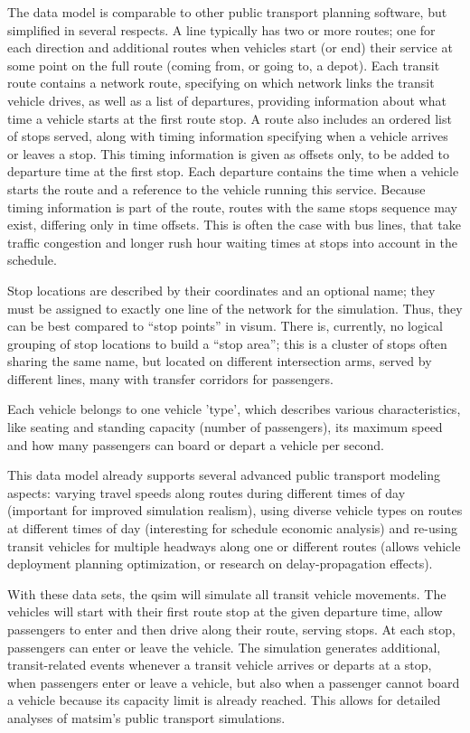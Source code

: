 The data model is comparable to other public transport planning
software, but simplified in several respects. A line typically has two or more
routes; one for each direction and additional routes when vehicles start
(or end) their service at some point on the full route (coming
from, or going to, a depot). Each transit route contains a network route,
specifying on which network links the transit vehicle drives, as well as
a list of departures, providing information about what time a vehicle
starts at the first route stop. A route also includes an ordered list
of stops served, along with timing information specifying when a vehicle
arrives or leaves a stop. This timing information is given as offsets only, to
be added to departure time at the first stop. Each departure contains the
time when a vehicle starts the route and a reference to the vehicle 
running this service. Because timing information is part of the route, routes
with the same stops sequence may exist, differing only in time offsets.
This is often the case with bus lines, that take traffic congestion and
longer rush hour waiting times at stops into account in the schedule. 

Stop locations are described by their coordinates and an optional name; they must
be assigned to exactly one line of the network for the simulation. Thus, they
can be best compared to ``stop points'' in \gls{visum}. There is, currently, no logical
grouping of stop locations to build a ``stop area''; this is a cluster of
stops often sharing the same name, but located on different intersection arms, 
served by different lines, many with transfer corridors for passengers.

Each vehicle belongs to one vehicle 'type', which describes various
characteristics, like seating and standing capacity (number of
passengers), its maximum speed and how many passengers can board or depart
a vehicle per second.

This data model already supports several advanced public transport modeling aspects: 
varying travel speeds along routes during different
times of day (important for improved simulation realism), using diverse vehicle types 
on routes at different times of day (interesting for schedule
economic analysis) and re-using transit vehicles for multiple
headways along one or different routes (allows vehicle deployment planning optimization, 
or research on delay-propagation effects).

With these data sets, the \gls{qsim} will simulate all transit vehicle movements.
The vehicles will start with their first route stop at the given
departure time, allow passengers to enter and then drive along their route,
serving stops. At each stop, passengers can enter or leave the vehicle.
The simulation generates additional, transit-related events whenever a transit
vehicle arrives or departs at a stop, when passengers enter or leave a vehicle,
but also when a passenger cannot board a vehicle because its capacity
limit is already reached. This allows for detailed analyses of \gls{matsim}'s public 
transport simulations.

